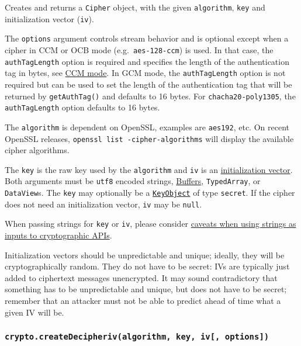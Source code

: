 Creates and returns a \texttt{Cipher} object, with the given
\texttt{algorithm}, \texttt{key} and initialization vector
(\texttt{iv}).

The \texttt{options} argument controls stream behavior and is optional
except when a cipher in CCM or OCB mode
(e.g.~\texttt{\textquotesingle{}aes-128-ccm\textquotesingle{}}) is used.
In that case, the \texttt{authTagLength} option is required and
specifies the length of the authentication tag in bytes, see
\hyperref[ccm-mode]{CCM mode}. In GCM mode, the \texttt{authTagLength}
option is not required but can be used to set the length of the
authentication tag that will be returned by \texttt{getAuthTag()} and
defaults to 16 bytes. For \texttt{chacha20-poly1305}, the
\texttt{authTagLength} option defaults to 16 bytes.

The \texttt{algorithm} is dependent on OpenSSL, examples are
\texttt{\textquotesingle{}aes192\textquotesingle{}}, etc. On recent
OpenSSL releases, \texttt{openssl\ list\ -cipher-algorithms} will
display the available cipher algorithms.

The \texttt{key} is the raw key used by the \texttt{algorithm} and
\texttt{iv} is an
\href{https://en.wikipedia.org/wiki/Initialization_vector}{initialization
vector}. Both arguments must be
\texttt{\textquotesingle{}utf8\textquotesingle{}} encoded strings,
\href{buffer.md}{Buffers}, \texttt{TypedArray}, or \texttt{DataView}s.
The \texttt{key} may optionally be a
\hyperref[class-keyobject]{\texttt{KeyObject}} of type \texttt{secret}.
If the cipher does not need an initialization vector, \texttt{iv} may be
\texttt{null}.

When passing strings for \texttt{key} or \texttt{iv}, please consider
\hyperref[using-strings-as-inputs-to-cryptographic-apis]{caveats when
using strings as inputs to cryptographic APIs}.

Initialization vectors should be unpredictable and unique; ideally, they
will be cryptographically random. They do not have to be secret: IVs are
typically just added to ciphertext messages unencrypted. It may sound
contradictory that something has to be unpredictable and unique, but
does not have to be secret; remember that an attacker must not be able
to predict ahead of time what a given IV will be.

\subsubsection{\texorpdfstring{\texttt{crypto.createDecipheriv(algorithm,\ key,\ iv{[},\ options{]})}}{crypto.createDecipheriv(algorithm, key, iv{[}, options{]})}}\label{crypto.createdecipherivalgorithm-key-iv-options}

